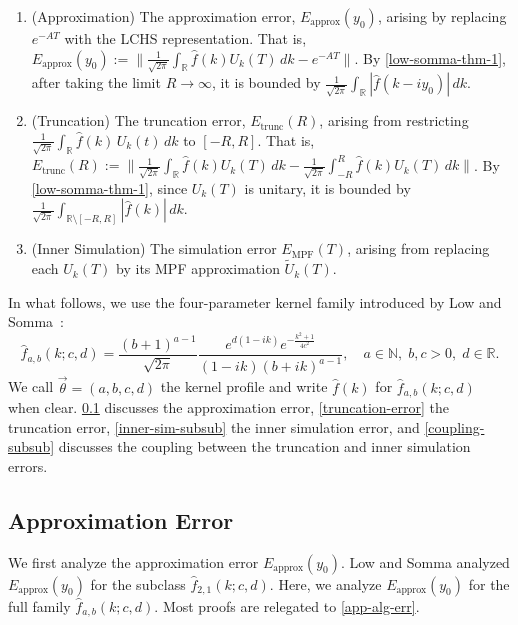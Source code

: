 \documentclass[10pt,reqno]{article}
\numberwithin{equation}{section}
\theoremstyle{plain}
\theoremstyle{definition}
\begin{document}
\begin{enumerate}
\item (Approximation) The approximation error, \(E_{\mathrm{approx}}(y_0)\), arising by replacing \(e^{-AT}\) with the LCHS representation. That is, $E_{\mathrm{approx}}(y_0) :=  \| \frac{1}{\sqrt{2\pi}}\int_{\mathbb R}\hat f(k)U_k(T)\,dk - e^{-AT}  \|$. By \cref{low-somma-thm-1}, after taking the limit \(R\to\infty\), it is bounded by \(\frac{1}{\sqrt{2\pi}}\int_{\mathbb{R}}|\hat f(k-iy_0)|\,dk\).

\item (Truncation) The truncation error, \(E_{\mathrm{trunc}}(R)\), arising from restricting \(\frac{1}{\sqrt{2\pi}}\int_{\mathbb{R}}\hat f(k)\,U_k(t)\,dk\) to \([-R,R]\). That is, $E_{\mathrm{trunc}}(R) :=\| \frac{1}{\sqrt{2\pi}}\int_{\mathbb R}\hat f(k)U_k(T)\,dk - \frac{1}{\sqrt{2\pi}}\int_{-R}^{R}\hat f(k)U_k(T)\,dk \|$. By \cref{low-somma-thm-1}, since $U_k(T)$ is unitary, it is bounded by \(\frac{1}{\sqrt{2\pi}}\int_{\mathbb{R}\setminus[-R,R]}|\hat f(k)|\,dk\).

\item (Inner Simulation) The simulation error \(E_{\mathrm{MPF}}(T)\), arising from replacing each \(U_k(T)\) by its MPF approximation \(\widetilde U_k(T)\).
\end{enumerate}

In what follows, we use the four-parameter kernel family introduced by Low and Somma~\cite{low2025optimallchs}:
\begin{equation}\label{low-somma-kernel}
\hat{f}_{a,b}(k;c,d) = \frac{(b+1)^{a-1}}{\sqrt{2\pi}} \frac{e^{d(1-ik)} e^{-\frac{k^2+1}{4c^2}}}{(1-ik)(b+ik)^{a-1}}, \quad a \in \mathbb{N},\; b,c>0,\; d\in\mathbb{R}.
\end{equation}
We call \(\vec{\theta}=(a,b,c,d)\) the kernel profile and write \(\hat f(k)\) for \(\hat f_{a,b}(k;c,d)\) when clear. 
\cref{approx-error-time-indept} discusses the approximation error, \cref{truncation-error} the truncation error, \cref{inner-sim-subsub} the inner simulation error, and \cref{coupling-subsub} discusses the coupling between the truncation and inner simulation errors.

\subsection{Approximation Error}\label{approx-error-time-indept}
We first analyze the approximation error \(E_{\mathrm{approx}}(y_0)\). Low and Somma analyzed \(E_{\mathrm{approx}}(y_0)\) for the subclass \(\hat{f}_{2,1}(k;c,d)\). Here, we analyze \(E_{\mathrm{approx}}(y_0)\) for the full family \(\hat{f}_{a,b}(k;c,d)\). Most proofs are relegated to \cref{app-alg-err}.
\end{document}
